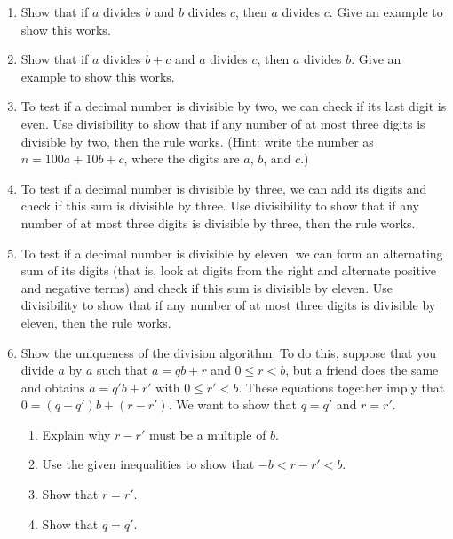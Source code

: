 \documentclass{book}
\theoremstyle{plain}
\theoremstyle{definition}
\newif\ifprintsolutions
\newcommand{\solution}[1]{\ifprintsolutions \begin{sloppypar}{\it #1}\end{sloppypar} \fi} %
\begin{document}
\begin{enumerate}
\item Show that if $a$ divides $b$ and $b$ divides $c$, then $a$ divides $c$. Give an example to show this works. \solution{We have $b = ma$ and $c = nb$ for some $m$ and $n$. Then $c = nb = n(ma) = (nm)a$.}
\item Show that if $a$ divides $b+c$ and $a$ divides $c$, then $a$ divides $b$. Give an example to show this works. \solution{We have $b+c=ma$ and $c=na$ for some $m$ and $n$. Then $b = ma-c = ma-na = (m-n)a$.}
\item To test if a decimal number is divisible by two, we can check if its last digit is even. Use divisibility to show that if any number of at most three digits is divisible by two, then the rule works. (Hint: write the number as $n = 100a + 10b + c$, where the digits are $a$, $b$, and $c$.) \solution{Since $n$ is divisible by two and $100a + 10b$ is divisible by two, our previous work shows $c$ must be divisible by two.}
\item To test if a decimal number is divisible by three, we can add its digits and check if this sum is divisible by three. Use divisibility to show that if any number of at most three digits is divisible by three, then the rule works. \solution{Write $n = 100a + 10b + c = (99a + 9b) + (a + b + c)$ and apply the same method as before.}
\item To test if a decimal number is divisible by eleven, we can form an alternating sum of its digits (that is, look at digits from the right and alternate positive and negative terms) and check if this sum is divisible by eleven. Use divisibility to show that if any number of at most three digits is divisible by eleven, then the rule works. \solution{Write $n = 100a + 10b + c = (99a + 11b) + (a - b + c)$ and apply the same method as before.}
\item Show the uniqueness of the division algorithm. To do this, suppose that you divide $a$ by $a$ such that $a = qb+r$ and $0 \leq r < b$, but a friend does the same and obtains $a = q'b+r'$ with $0 \leq r' < b$. These equations together imply that $0 = (q-q')b + (r-r')$. We want to show that $q=q'$ and $r=r'$.
\begin{enumerate}
\item Explain why $r-r'$ must be a multiple of $b$.
\item Use the given inequalities to show that $-b < r-r' < b$.
\item Show that $r = r'$.
\item Show that $q = q'$.
\end{enumerate}
\end{enumerate}
\end{document}
